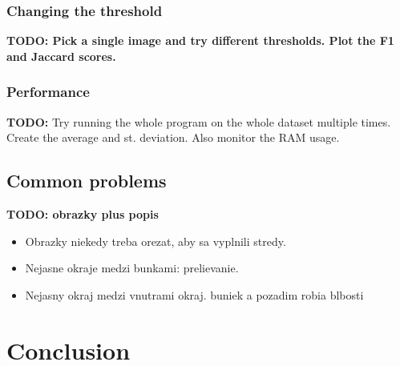 \documentclass[
  digital,     %
  oneside,     %
  nosansbold,  %
  nocolorbold, %
  lof,         %
  lot,         %
]{fithesis4}
\begin{document}
\subsection{Changing the threshold}

\textbf{TODO: Pick a single image and try different thresholds. Plot the F1 and
Jaccard scores.}

\subsection{Performance}

\textbf{TODO:} Try running the whole program on the whole dataset multiple
times. Create the average and st. deviation. Also monitor the RAM usage.

\section{Common problems}

\textbf{TODO: obrazky plus popis}
\begin{itemize}
    \item Obrazky niekedy treba orezat, aby sa vyplnili stredy.
    \item Nejasne okraje medzi bunkami: prelievanie.
    \item Nejasny okraj medzi vnutrami okraj. buniek a pozadim robia blbosti
\end{itemize}

\chapter{Conclusion}
\end{document}
